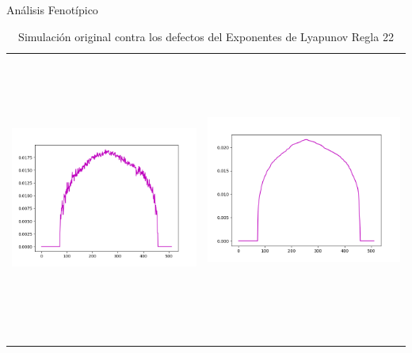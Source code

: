 \documentclass[12pt, letterpaper]{article}
\renewcommand{\rule}{Regla 22}
\begin{document}
\begin{section}{Análisis Fenotípico}
\begin{table}[H]
\begin{tabular}{cc}
    \includegraphics[width=90mm ,max height=90mm , keepaspectratio]{LyapunovExp.png} & \includegraphics[width=90mm ,max height=90mm , keepaspectratio]{LyapunovExpNorm.png} \ 
    \end{tabular} 
    \caption{Simulación original contra los defectos del Exponentes de Lyapunov \rule} 
    \end{table} 
    \end{section} 
    \clearpage 
\end{document}
